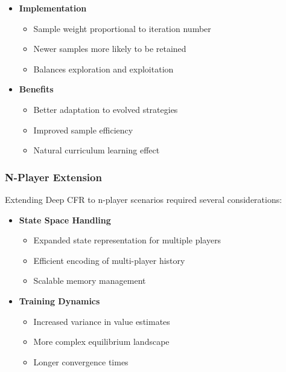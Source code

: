 \documentclass[11pt]{article}
\begin{document}
\begin{itemize}
    \begin{itemize}
        \item \textbf{Implementation}
        \begin{itemize}
            \item Sample weight proportional to iteration number
            \item Newer samples more likely to be retained
            \item Balances exploration and exploitation
        \end{itemize}
        
        \item \textbf{Benefits}
        \begin{itemize}
            \item Better adaptation to evolved strategies
            \item Improved sample efficiency
            \item Natural curriculum learning effect
        \end{itemize}
    \end{itemize}

    \subsubsection{N-Player Extension}
    Extending Deep CFR to n-player scenarios required several considerations:

    \begin{itemize}
        \item \textbf{State Space Handling}
        \begin{itemize}
            \item Expanded state representation for multiple players
            \item Efficient encoding of multi-player history
            \item Scalable memory management
        \end{itemize}
        
        \item \textbf{Training Dynamics}
        \begin{itemize}
            \item Increased variance in value estimates
            \item More complex equilibrium landscape
            \item Longer convergence times
        \end{itemize}
    \end{itemize}
    

\end{itemize}
\end{document}
